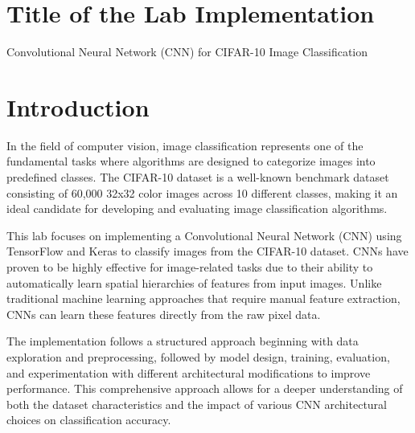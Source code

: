 \documentclass[12pt]{article}
\begin{document}
\newpage
{}


\section{Title of the Lab Implementation}
Convolutional Neural Network (CNN) for CIFAR-10 Image Classification

\section{Introduction}
In the field of computer vision, image classification represents one of the fundamental tasks where algorithms are designed to categorize images into predefined classes. The CIFAR-10 dataset is a well-known benchmark dataset consisting of 60,000 32x32 color images across 10 different classes, making it an ideal candidate for developing and evaluating image classification algorithms.

This lab focuses on implementing a Convolutional Neural Network (CNN) using TensorFlow and Keras to classify images from the CIFAR-10 dataset. CNNs have proven to be highly effective for image-related tasks due to their ability to automatically learn spatial hierarchies of features from input images. Unlike traditional machine learning approaches that require manual feature extraction, CNNs can learn these features directly from the raw pixel data.

The implementation follows a structured approach beginning with data exploration and preprocessing, followed by model design, training, evaluation, and experimentation with different architectural modifications to improve performance. This comprehensive approach allows for a deeper understanding of both the dataset characteristics and the impact of various CNN architectural choices on classification accuracy.
\end{document}
